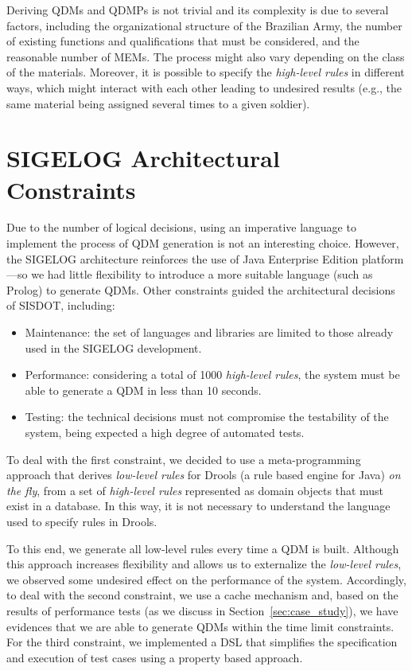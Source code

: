 \documentclass[AMA,STIX1COL,hidelinks]{WileyNJD-v2}
\newcommand{\callers}{\emph{high-level rules}\xspace}
\begin{document}
Deriving QDMs and QDMPs is not trivial and its complexity is due to several factors, including the organizational structure of the Brazilian Army, the number of existing functions and qualifications that must be considered, and the reasonable number of MEMs. The process might also vary depending on the class of the materials. Moreover, it is possible to specify the \callers in different ways, which might interact with each other leading to undesired results (e.g., the same material being assigned several times to a given soldier). 

\section{SIGELOG Architectural Constraints}
\label{sigelog}

Due to the number of logical decisions, using an imperative language to implement the process of QDM generation 
is not an interesting choice. However, the SIGELOG architecture reinforces the use of Java Enterprise Edition platform---so we had little flexibility to introduce a more suitable language (such as Prolog) to generate QDMs. Other constraints guided the architectural decisions of SISDOT, including:  

\begin{itemize}
	\item Maintenance: the set of languages and libraries are limited to those already used in the SIGELOG development.  
	\item Performance: considering a total of 1000 \callers, the system must be able to generate a QDM in less than 10 seconds.
	\item Testing: the technical decisions must not compromise the testability of the system, being expected a high degree of automated tests. 
\end{itemize}

To deal with the first constraint, we decided to use a meta-programming approach that derives \emph{low-level rules} for Drools (a rule based engine for Java) \emph{on the fly}, from a set of \callers represented as domain objects that must exist in a database. In this way, it is not necessary to understand the language used to specify rules in Drools.

To this end, we generate all low-level rules every time a QDM is built.
Although this approach increases flexibility and allows us to externalize the \emph{low-level rules}, we observed some undesired effect on the performance of the system. Accordingly, to deal with the second constraint, we use a cache mechanism and, based on the results of performance tests (as we discuss in Section~\ref{sec:case_study}), we have evidences that we are able to generate QDMs within the time
limit constraints. For the third constraint, we implemented a DSL that simplifies the specification and execution of test cases using a property based approach. 
\end{document}
